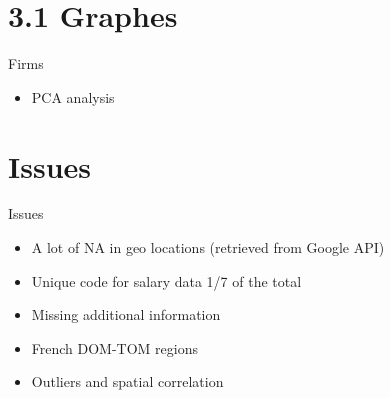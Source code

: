 \documentclass[xcolor=dvipsnames]{beamer}
\begin{document}
\section{3.1 Graphes}
\begin{frame}{\centerline{\huge\textcolor{bscuro}{Firms}}}
	\begin{itemize}
		\item PCA analysis
	\end{itemize}

\begin{figure}[!ht] 
	\centering
\end{figure}
\end{frame}




\section{Issues}
		\begin{frame}{\vskip 0.05cm\centerline{\Huge\textcolor{bscuro}{Issues}}}
		
				\begin{itemize}
						\item A lot of NA in geo locations (retrieved from Google API)
						\item Unique code for salary data 1/7 of the total 
						\item Missing additional information 
						\item French DOM-TOM regions
						\item Outliers and spatial correlation
				\end{itemize}

\end{frame}			
		
\end{document}
